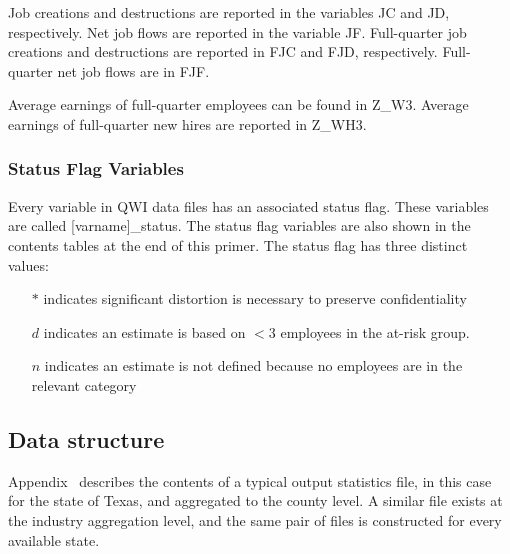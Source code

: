 Job creations and destructions are reported in the variables \textsf{JC} and 
\textsf{JD}, respectively. Net job flows are reported in the variable 
\textsf{JF}. Full-quarter job creations and destructions are reported in 
\textsf{FJC} and \textsf{FJD}, respectively. Full-quarter net job flows are
in \textsf{FJF}.

Average earnings of full-quarter employees can be found in \textsf{Z\_W3}.
Average earnings of full-quarter new hires are reported in \textsf{Z\_WH3}.


\subsubsection{Status Flag Variables}


Every variable in QWI data files has an associated status flag. These
variables are called \textsf{[varname]\_status}. The status flag variables
are also shown in the contents tables at the end of this primer. The status
flag has three distinct values:

\begin{itemize}
\item[$*$] indicates significant distortion is necessary to preserve
confidentiality

\item[$d$] indicates an estimate is based on $<3$ employees in the at-risk group.

\item[$n$] indicates an estimate is not defined because no employees are in
the relevant category
\end{itemize}


\subsection{Data structure\label{primer_tables}}

Appendix~ describes the contents of a typical
output statistics file, in this case for the state of Texas, and aggregated
to the county level. A similar file exists at the industry aggregation
level, and the same pair of files is constructed for every available state.

